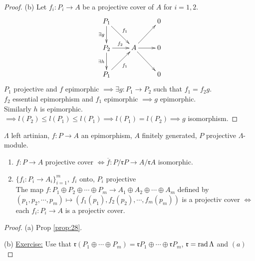 \begin{thm}
\begin{proof}
(b) Let $f_i \colon  P_i \to A$ be a projective cover of $A$ for $i = 1, 2$.
\[\xymatrix{
P_1 \ar[dr]^{f_1} \ar[d]_{\exists g}&& 0\\
P_2 \ar[r]^{f_2} \ar[d]_{\exists h} & A \ar[r]\ar[dr]\ar[ur] & 0\\
P_1 \ar[ur]_{f_1} && 0
}\]
$P_1$ projective and $f$ epimorphic $\implies \exists g\colon  P_1 \to P_2$ such that $f_1 = f_2g$.\\
$f_2$ essential epimorphism and $f_1$ epimorphic $\implies g$ epimorphic.\\
Similarly $h$ is epimorphic.\\
$\implies l(P_2) \leq l(P_1) \leq l(P_1) \implies l(P_1) = l(P_2) \implies g$ isomorphism. 
\end{proof}
\end{thm}

\begin{prop}
\label{prop:proj_covers->top_iso}
$\Lambda$ left artinian, $f\colon  P \to A$ an epimorphism, $A$ finitely generated, $P$ projective $\Lambda$-module.
\begin{enumerate}
\item[(a)] $f\colon P \to A$ projective cover $\iff \overline{f}\colon  P/\mathfrak{r}P \to A/\mathfrak{r}A$ isomorphic.
\item[(b)] $\{ f_i \colon  P_i \to A_i \}_{i=1}^m$, $f_i$ onto, $P_i$ projective\\
The map $f\colon  P_1 \oplus P_2 \oplus \cdots \oplus P_m \to A_1 \oplus A_2 \oplus \cdots \oplus A_m $ defined by $(p_1, p_2, \cdots , p_m) \mapsto (f_1(p_1), f_2(p_2), \cdots , f_m(p_m))$ is a projectiv cover $\iff$ each $f_i\colon P_i \to A$ is a projectiv cover.
\end{enumerate}

\begin{proof}
(a) Prop \ref{prop:28}.

(b) \underline{Exercise:} Use that $\mathfrak{r}(P_1 \oplus \cdots
\oplus P_m) = \mathfrak{r}P_1 \oplus \cdots \oplus \mathfrak{r}P_m$,
$\mathfrak{r} = \operatorname{rad}\nolimits \Lambda$ and $(a)$
\end{proof}
\end{prop}

